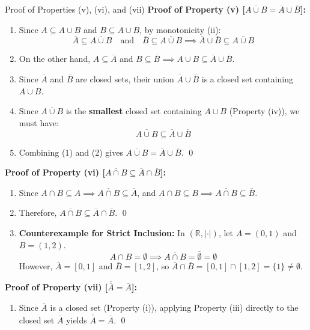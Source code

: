 \documentclass[11pt,a4paper]{article}
\begin{document}
\begin{exbox}{Proof of Properties (v), (vi), and (vii)}
\textbf{Proof of Property (v) [$\overline{A \cup B} = \overline{A} \cup \overline{B}$]:}
\begin{enumerate}
    \item Since $A \subseteq A \cup B$ and $B \subseteq A \cup B$, by monotonicity (ii):
    \begin{equation}
        \overline{A} \subseteq \overline{A \cup B} \quad \text{and} \quad \overline{B} \subseteq \overline{A \cup B} \implies \overline{A} \cup \overline{B} \subseteq \overline{A \cup B} \tag{1}
    \end{equation}
    \item On the other hand, $A \subseteq \overline{A}$ and $B \subseteq \overline{B} \implies A \cup B \subseteq \overline{A} \cup \overline{B}$.
    \item Since $\overline{A}$ and $\overline{B}$ are closed sets, their union $\overline{A} \cup \overline{B}$ is a closed set containing $A \cup B$.
    \item Since $\overline{A \cup B}$ is the \textbf{smallest} closed set containing $A \cup B$ (Property (iv)), we must have:
    \begin{equation}
        \overline{A \cup B} \subseteq \overline{A} \cup \overline{B} \tag{2}
    \end{equation}
    \item Combining (1) and (2) gives $\overline{A \cup B} = \overline{A} \cup \overline{B}$. \qed
\end{enumerate}

\textbf{Proof of Property (vi) [$\overline{A \cap B} \subseteq \overline{A} \cap \overline{B}$]:}
\begin{enumerate}
    \item Since $A \cap B \subseteq A \implies \overline{A \cap B} \subseteq \overline{A}$, and $A \cap B \subseteq B \implies \overline{A \cap B} \subseteq \overline{B}$.
    \item Therefore, $\overline{A \cap B} \subseteq \overline{A} \cap \overline{B}$. \qed
    \item \textbf{Counterexample for Strict Inclusion:} In $(\mathbb{R}, |\cdot|)$, let $A = (0, 1)$ and $B = (1, 2)$.
    $$A \cap B = \emptyset \implies \overline{A \cap B} = \overline{\emptyset} = \emptyset$$
    However, $\overline{A} = [0, 1]$ and $\overline{B} = [1, 2]$, so $\overline{A} \cap \overline{B} = [0, 1] \cap [1, 2] = \{1\} \neq \emptyset$.
\end{enumerate}

\textbf{Proof of Property (vii) [$\overline{\overline{A}} = \overline{A}$]:}
\begin{enumerate}
    \item Since $\overline{A}$ is a closed set (Property (i)), applying Property (iii) directly to the closed set $\overline{A}$ yields $\overline{\overline{A}} = \overline{A}$. \qed
\end{enumerate}
\end{exbox}
\end{document}

